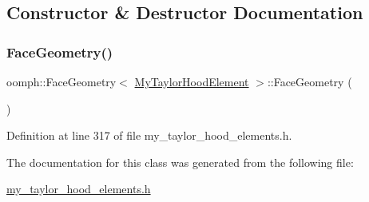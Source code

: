\subsection{Constructor \& Destructor Documentation}
\mbox{\label{classoomph_1_1FaceGeometry_3_01MyTaylorHoodElement_01_4_a604dfaeec030bb7a08069c0e2c8805ab}} 
\subsubsection{\texorpdfstring{Face\+Geometry()}{FaceGeometry()}}
{\footnotesize\ttfamily oomph\+::\+Face\+Geometry$<$ \hyperlink{classoomph_1_1MyTaylorHoodElement}{My\+Taylor\+Hood\+Element} $>$\+::Face\+Geometry (\begin{DoxyParamCaption}{ }\end{DoxyParamCaption})\hspace{0.3cm}{\ttfamily [inline]}}



Definition at line 317 of file my\+\_\+taylor\+\_\+hood\+\_\+elements.\+h.



The documentation for this class was generated from the following file\+:\begin{DoxyCompactItemize}
\item 
\hyperlink{my__taylor__hood__elements_8h}{my\+\_\+taylor\+\_\+hood\+\_\+elements.\+h}\end{DoxyCompactItemize}
